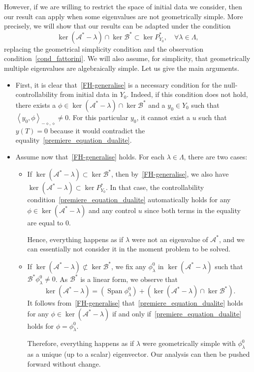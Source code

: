 \documentclass[11pt]{article}
\theoremstyle{definition}
\numberwithin{equation}{section}
\numberwithin{figure}{section}
\numberwithin{table}{section}
\newcommand\As{\mathcal{A}^*}
\newcommand\Bs{\mathcal{B}^*}
\newcommand{\Fzp}{Y_0}
\newcommand{\dual}[2]{\left\langle #1, #2 \right\rangle_{-\diamond,\diamond}}
\newcommand{\PFa}{P_{\Fzp}^*}
\DeclareMathOperator{\Span}{Span}
\let\oldforall\forall
\renewcommand*{\forall}{\mathrel{\oldforall}}
\begin{document}
However, if we are willing to restrict the space of initial data we consider, then our result can apply when some eigenvalues are not geometrically simple. More precisely, we will show that our results can be adapted under the condition
\begin{equation}\label{FH-generalise}
\ker(\As-\lambda) \cap \ker \Bs \subset \ker \PFa, \quad \forall \lambda \in \Lambda,
\end{equation}
replacing the geometrical simplicity condition and the observation condition~\eqref{cond_fattorini}. We will also assume, for simplicity, that geometrically multiple eigenvalues are algebraically simple. Let us give the main arguments.
\begin{itemize}
\item First, it is clear that~\eqref{FH-generalise} is a necessary condition for the null-controllability from initial data in $\Fzp$. Indeed, if this condition does not hold, there exists a $\phi\in \ker(\As-\lambda) \cap \ker \Bs$ and a $y_0\in \Fzp$ such that $\dual{y_0}{\phi}\neq 0$. For this particular $y_0$, it cannot exist a $u$ such that $y(T)=0$ because it would contradict the equality~\eqref{premiere_equation_dualite}.
\item Assume now that~\eqref{FH-generalise} holds. For each $\lambda\in \Lambda$, there are two cases:
\begin{itemize}
\item If $\ker(\As-\lambda)\subset \ker \Bs$, then by~\eqref{FH-generalise}, we also have $\ker(\As-\lambda)\subset \ker \PFa$. In that case, the controllability condition~\eqref{premiere_equation_dualite} automatically holds for any $\phi\in \ker(\As-\lambda)$ and any control $u$ since both terms in the equality are equal to $0$.

Hence, everything happens as if $\lambda$ were not an eigenvalue of $\As$, and we can essentially not consider it in the moment problem to be solved.
\item If $\ker(\As-\lambda)\not\subset \ker \Bs$, we fix any $\phi_\lambda^0$ in $\ker(\As-\lambda)$ such that $\Bs \phi_\lambda^0\neq 0$. As $\Bs$ is a linear form, we observe that
\[
\ker(\As-\lambda) = \left(\Span \phi_\lambda^0\right) + \left(\ker(\As-\lambda)\cap \ker \Bs\right).
\]
It follows from~\eqref{FH-generalise} that~\eqref{premiere_equation_dualite} holds for any $\phi\in \ker(\As-\lambda)$ if and only if~\eqref{premiere_equation_dualite} holds for $\phi=\phi_\lambda^0$.

Therefore, everything happens as if $\lambda$ were geometrically simple with $\phi_\lambda^0$ as a unique (up to a scalar) eigenvector. Our analysis can then be pushed forward without change.
\end{itemize}
\end{itemize}
\end{document}
